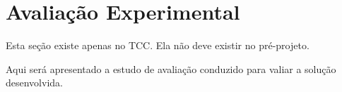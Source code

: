 \section{Avaliação Experimental}\label{sec:avaliacao-experimental}

Esta seção existe apenas no TCC. Ela não deve existir no pré-projeto.

Aqui será apresentado a estudo de avaliação conduzido para valiar a solução desenvolvida.